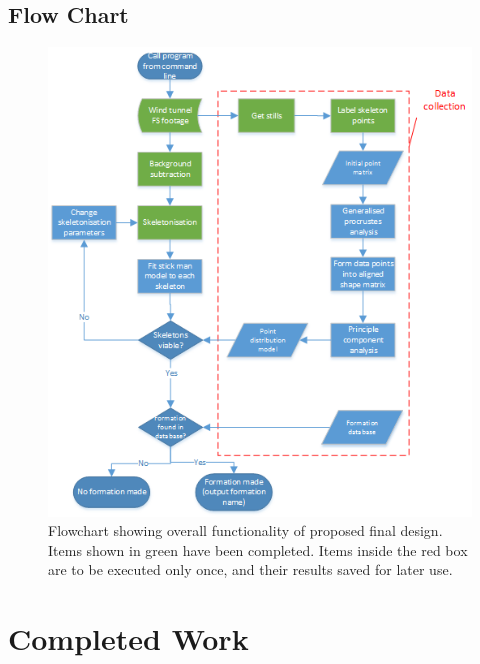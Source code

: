 \documentclass[a4paper, 12pt]{article}
\begin{document}
\subsection{Flow Chart}
%
\begin{figure}[H]
	\centering
	\includegraphics[width=\linewidth]{flow_chart.png}
	\caption{Flowchart showing overall functionality of proposed final design. Items shown in green have been completed. Items inside the red box are to be executed only once, and their results saved for later use.}
	\label{fig:flowchart}
\end{figure}
%
%
\section{Completed Work}
\end{document}
